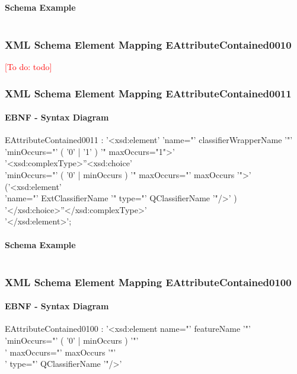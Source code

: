 \documentclass[11pt,a4paper]{article}
\newcommand{\addtodo}[1]{\textcolor{red}{[To do: #1]}\index{TODO: #1}}
\begin{document}
\paragraph{Schema Example}
\inputminted[fontsize=\footnotesize]{xml}{examples/SchemaEAttributeContained0001.xml}


\subsubsection{XML Schema Element Mapping EAttributeContained0010}
\addtodo{todo}


\subsubsection{XML Schema Element Mapping EAttributeContained0011}
\paragraph{EBNF - Syntax Diagram}
\begin{rail}
EAttributeContained0011 :
'<xsd:element' 'name="' classifierWrapperName '"'\\
    'minOccurs="' ( '0' | '1' ) '" maxOccurs="1">' \\
'<xsd:complexType>''<xsd:choice' \\
    'minOccurs="' ( '0' | minOccurs ) '" maxOccurs="' maxOccurs '">' \\
('<xsd:element' \\ 
'name="' ExtClassifierName '" type="' QClassifierName '"/>' )\\
'</xsd:choice>''</xsd:complexType>'  \\
    '</xsd:element>';
\end{rail}

\paragraph{Schema Example}
\inputminted[fontsize=\footnotesize]{xml}{examples/SchemaEAttributeContained0011.xml}


\subsubsection{XML Schema Element Mapping EAttributeContained0100}
\paragraph{EBNF - Syntax Diagram}
\begin{rail}
EAttributeContained0100 :
'<xsd:element name="' featureName '"'\\
    'minOccurs="' ( '0' | minOccurs ) '"'\\
    ' maxOccurs="' maxOccurs '"'\\
    ' type="' QClassifierName '"/>' 
\end{rail}
\end{document}

